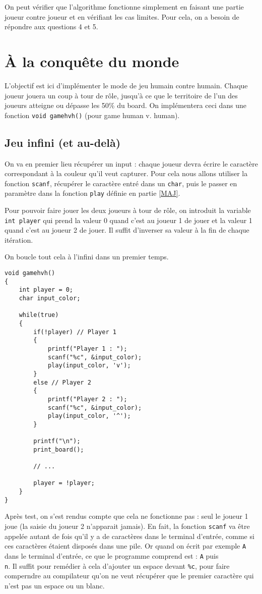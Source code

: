 \documentclass[a4paper,11pt]{article}
\begin{document}
	On peut vérifier que l'algorithme fonctionne simplement en faisant une partie joueur contre joueur et en vérifiant les cas limites. Pour cela, on a besoin de répondre aux questions 4 et 5.
	
	
	
	\section{À la conquête du monde}
	
	L'objectif est ici d'implémenter le mode de jeu humain contre humain. Chaque joueur jouera un coup à tour de rôle, jusqu'à ce que le territoire de l'un des joueurs atteigne ou dépasse les 50\% du board. On implémentera ceci dans une fonction \texttt{void gamehvh()} (pour game human v. human).
	
	
	\subsection{Jeu infini (et au-delà)}
	
	On va en premier lieu récupérer un input : chaque joueur devra écrire le caractère correspondant à la couleur qu'il veut capturer. Pour cela nous allons utiliser la fonction \texttt{scanf}, récupérer le caractère entré dans un \texttt{char}, puis le passer en paramètre dans la fonction \texttt{play} définie en partie \ref{MAJ}.
	
	Pour pouvoir faire jouer les deux joueurs à tour de rôle, on introduit la variable \texttt{int player} qui prend la valeur 0 quand c'est au joueur 1 de jouer et la valeur 1 quand c'est au joueur 2 de jouer. Il suffit d'inverser sa valeur à la fin de chaque itération.
	
	On boucle tout cela à l'infini dans un premier temps.
	
	\begin{lstlisting}
void gamehvh()
{	
	int player = 0;
	char input_color;
	
	while(true)
	{
		if(!player) // Player 1
		{
			printf("Player 1 : ");
			scanf("%c", &input_color);
			play(input_color, 'v');
		}
		else // Player 2
		{
			printf("Player 2 : ");
			scanf("%c", &input_color);
			play(input_color, '^');
		}
		
		printf("\n");
		print_board();
		
		// ...
		
		player = !player;
	}
}
	\end{lstlisting}
	
	Après test, on s'est rendus compte que cela ne fonctionne pas : seul le joueur 1 joue (la saisie du joueur 2 n'apparait jamais). En fait, la fonction \texttt{scanf} va être appelée autant de fois qu'il y a de caractères dans le terminal d'entrée, comme si ces caractères étaient disposés dans une pile. Or quand on écrit par exemple \texttt{A} dans le terminal d'entrée, ce que le programme comprend est : \texttt{A} puis \texttt{\\n}. Il suffit pour remédier à cela d'ajouter un espace devant \texttt{\%c}, pour faire comperndre au compilateur qu'on ne veut récupérer que le premier caractère qui n'est pas un espace ou un blanc.
	
\end{document}

